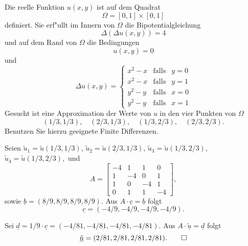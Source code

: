 Die reelle Funktion $u(x,y)$ ist auf dem Quadrat
\[
\Omega = [0, 1] \times [0,1]
\]
definiert. Sie erf"ullt im Innern von $\Omega$ die Bipotentialgleichung
\[
\Delta ( \Delta u(x,y)) = 4
\]
und auf dem Rand von $\Omega$ die Bedingungen
\[
u(x,y) = 0
\]
und
\[
\Delta u(x,y)
=
\left\{
\begin{array}{ccl}
x^2 - x & \text{falls} & y = 0 \\
x^2 - x & \text{falls} & y = 1 \\
y^2 - y & \text{falls} & x = 0 \\
y^2 - y & \text{falls} & x = 1
\end{array} \right.
\]
Gesucht ist eine Approximation der Werte von $u$ in den vier Punkten von
$\Omega$
\[
(1/3,1/3), \quad  (2/3,1/3), \quad (1/3,2/3), \quad (2/3, 2/3).
\]
Benutzen Sie hierzu geeignete Finite Differenzen.

\begin{loesung}
Seien
$
\tilde u_1
=
\tilde u(1/3,1/3)
$,
$
\tilde u_2
=
\tilde u(2/3,1/3)
$,
$
\tilde u_3
=
\tilde u(1/3,2/3)$,
$
\tilde u_4
=
\tilde u(1/3,2/3),
$
und
\[
A = \left[\begin{array}{rrrr} 
-4  & 1  & 1 & 0 \\
 1 & -4 & 0 & 1 \\
 1 & 0 & -4 & 1 \\ 
 0 & 1 & 1  & -4  \end{array}\right],
\]
sowie
$\underline b = (8/9, 8/9, 8/9, 8/9)$.
Aus $A \cdot \underline{c} = \underline{b}$ folgt
\[
\underline{c} = (-4/9, -4/9, -4/9, - 4/9).
\]

Sei $\underline d = 1/9 \cdot \underline c = (-4/81, -4/81, -4/81, - 4/81)$.
Aus $A \cdot \underline{\tilde u} = \underline{d}$ folgt
\[
\underline{\tilde u} = (2/81, 2/81, 2/81, 2/81).
\qedhere
\]
\end{loesung}


